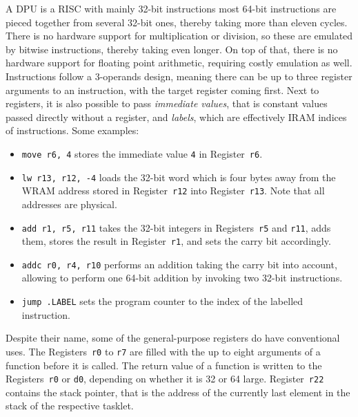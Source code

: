 A \ac{DPU} is a \ac{RISC} with mainly 32-bit instructions \Dash most 64-bit instructions are pieced together from several 32-bit ones, thereby taking more than eleven cycles.
There is no hardware support for multiplication or division, so these are emulated by bitwise instructions, thereby taking even longer.
On top of that, there is no hardware support for floating point arithmetic, requiring costly emulation as well.
Instructions follow a 3-operands design, meaning there can be up to three register arguments to an instruction, with the target register coming first.
Next to registers, it is also possible to pass \emph{immediate values}, that is constant values passed directly without a register, and \emph{labels}, which are effectively \ac{IRAM} indices of instructions.
Some examples:
\begin{itemize}
	\item
	\lstinline|move r6, 4| stores the immediate value \lstinline|4| in Register~\lstinline|r6|.

	\item
	\lstinline|lw r13, r12, -4| loads the 32-bit word which is four bytes away from the \ac{WRAM} address stored in Register~\lstinline|r12| into Register~\lstinline|r13|.
	Note that all addresses are physical.

	\item
	\lstinline|add r1, r5, r11| takes the 32-bit integers in Registers~\lstinline|r5| and \lstinline|r11|, adds them, stores the result in Register~\lstinline|r1|, and sets the carry bit accordingly.

	\item
	\lstinline|addc r0, r4, r10| performs an addition taking the carry bit into account, allowing to perform one 64-bit addition by invoking two 32-bit instructions.

	\item
	\lstinline|jump .LABEL| sets the program counter to the index of the labelled instruction.
\end{itemize}
Despite their name, some of the general-purpose registers do have conventional uses.
The Registers~\lstinline|r0| to \lstinline|r7| are filled with the up to eight arguments of a function before it is called.
The return value of a function is written to the Registers~\lstinline|r0| or \lstinline|d0|, depending on whether it is \qty{32}{\bits} or \qty{64}{\bits} large.
Register~\lstinline|r22| contains the stack pointer, that is the address of the currently last element in the stack of the respective tasklet.
